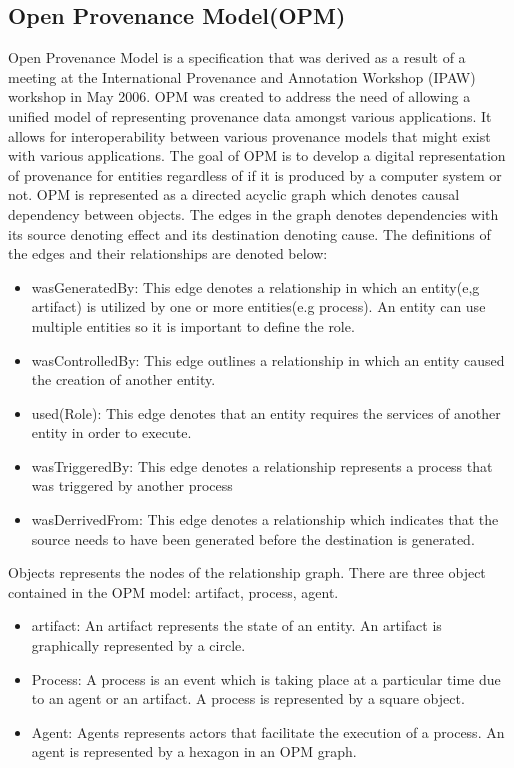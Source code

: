\subsection{Open Provenance Model(OPM)}

Open Provenance Model is a specification that was derived as a result of a meeting at the International Provenance and Annotation Workshop (IPAW) workshop in May 2006. OPM was created to address the need of allowing a unified model of representing provenance data amongst various applications. It allows for interoperability between various provenance models that might exist with various applications. The goal of OPM is to develop a digital representation of provenance for entities regardless of if it is produced by a computer system or not. OPM is represented as a directed acyclic graph which denotes causal dependency between objects. The edges in the graph denotes dependencies with its source denoting effect and its destination denoting cause. The definitions of the edges and their relationships are denoted below: 

\begin{itemize}
\item wasGeneratedBy: This edge denotes a  relationship in which an entity(e,g artifact) is utilized by one or  more entities(e.g process). An entity can use multiple entities so it is important to define the role.  
\item wasControlledBy: This edge outlines a relationship in which an entity caused the creation of another entity.
\item used(Role): This edge denotes that an entity requires the services of another entity in order to execute.
\item wasTriggeredBy: This edge denotes a relationship represents a process that was triggered by another process
\item wasDerrivedFrom: This edge denotes a relationship which indicates that the source needs to have been generated before the destination is generated.
\end{itemize}

 Objects represents the nodes of the relationship graph. There are three object contained in the OPM model: artifact, process, agent. 

\begin{itemize}
\item
artifact: An artifact represents the state of an entity. An artifact is graphically represented by a circle.

\item
Process: A process is an event which is taking place at a particular time due to an agent or an artifact. A process is represented by a square object.

\item 
Agent: Agents represents actors that facilitate the execution of a process. An agent is represented by a hexagon in an OPM graph.
\end{itemize}

